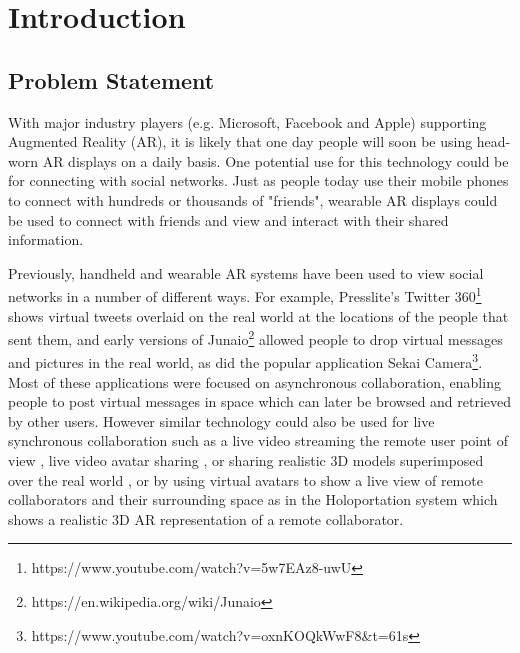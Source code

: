 \chapter{Introduction} %
\label{ch:intro} %


\section{Problem Statement}


With major industry players (e.g. Microsoft, Facebook and Apple) supporting Augmented Reality (AR), 
it is likely that one day people will soon be using head-worn AR displays on a daily basis. 
One potential use for this technology could be for connecting with social networks. 
Just as people today use their mobile phones to connect with hundreds or thousands of "friends", wearable AR displays could be used to connect with friends and view and interact with their shared information.

Previously, handheld and wearable AR systems have been used to view social networks in a number of different ways. For example, Presslite's Twitter 360\footnote{https://www.youtube.com/watch?v=5w7EAz8-uwU} shows virtual tweets overlaid on the real world at the locations of the people that sent them, and early versions of Junaio\footnote{https://en.wikipedia.org/wiki/Junaio} allowed people to drop virtual messages and pictures in the real world, as did the popular application Sekai Camera\footnote{https://www.youtube.com/watch?v=oxnKOQkWwF8\&t=61s}. Most of these applications were focused on asynchronous collaboration, enabling people to post virtual messages in space which can later be browsed and retrieved by other users. However similar technology could also be used for live synchronous collaboration such as a live video streaming the remote user point of view \cite{Nassani2016}, live video avatar sharing  \cite{Billinghurst2002}, or sharing realistic 3D models superimposed over the real world \cite{Fanello2016}, or by using virtual avatars to show a live view of remote collaborators and their surrounding space as in the Holoportation system  \cite{Fanello2016} which shows a realistic 3D AR representation of a remote collaborator.

